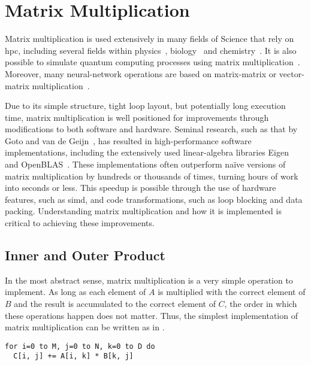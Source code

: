 \documentclass[\main/thesis.tex]{subfiles}
\begin{document}
\chapter{Matrix Multiplication}
\label{cha:matmul}
Matrix multiplication is used extensively in many fields of Science that rely on \gls{hpc}, including several fields within physics~\autocite{krol2014matrix}, biology~\autocite{akutsu2000algorithms} and chemistry~\autocite{weber2015semiempirical}.
It is also possible to simulate quantum computing processes using matrix multiplication~\autocite{zulehner2019matrix}.
Moreover, many neural-network operations are based on matrix-matrix or vector-matrix multiplication~\autocite{rojas1996neural,blue1992training}.

Due to its simple structure, tight loop layout, but potentially long execution time, matrix multiplication is well positioned for improvements through modifications to both software and hardware.
Seminal research, such as that by Goto and van de Geijn~\autocite{goto2008anatomy}, has resulted in high-performance software implementations, including the extensively used linear-algebra libraries Eigen~\autocite{guennebaud2021eigen} and OpenBLAS~\autocite{xianyi2012model}.
These implementations often outperform na\"ive versions of matrix multiplication by hundreds or thousands of times, turning hours of work into seconds or less.
This speedup is possible through the use of hardware features, such as \gls{simd}, and code transformations, such as loop blocking and data packing.
Understanding matrix multiplication and how it is implemented is critical to achieving these improvements.

\section{Inner and Outer Product}
\label{sec:products}
In the most abstract sense, matrix multiplication is a very simple operation to implement.
As long as each element of $A$ is multiplied with the correct element of $B$ and the result is accumulated to the correct element of $C$, the order in which these operations happen does not matter.
Thus, the simplest implementation of matrix multiplication can be written as in .
\begin{lstlisting}[caption={[Pseudocode for Matrix Multiplication]Pseudocode implementing matrix multiplication as simply as possible.},label=lst:basicMatMul,columns=flexible]
for i=0 to M, j=0 to N, k=0 to D do
  C[i, j] += A[i, k] * B[k, j]
\end{lstlisting}
\end{document}
